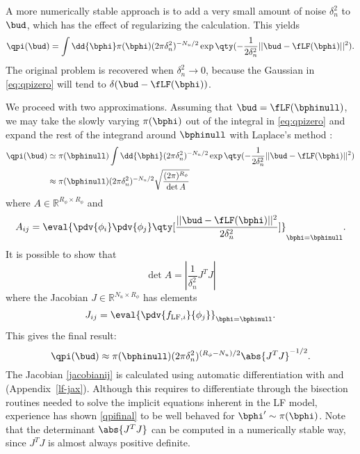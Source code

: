 \begin{chapterappendices}{4}
A more numerically stable approach is to add a very small amount of noise $\delta_n^2$ to $\bud$, which has the effect of regularizing the calculation.
This yields
\begin{equation}
\qpi(\bud) = \int \dd{\bphi} \pi(\bphi) (2 \pi \delta_n^2)^{-N_u/2} \exp\qty(-\frac{1}{2\delta_n^2} ||\bud - \fLF(\bphi)||^2). \label{eq:qpizero}
\end{equation}
The original problem is recovered when $\delta_n^2 \rightarrow 0$, because the Gaussian in \eqref{eq:qpizero} will tend to $\delta(\bud - \fLF(\bphi))$.

We proceed with two approximations.
Assuming that $\bud = \fLF(\bphinull)$, we may take the slowly varying $\pi(\bphi)$ out of the integral in \eqref{eq:qpizero} and expand the rest of the integrand around $\bphinull$ with Laplace's method \citep[Ch.~27]{MacKay2005}:
\begin{align}
    \qpi(\bud) &\simeq \pi(\bphinull) \int \dd{\bphi} (2 \pi \delta_n^2)^{-N_u/2} \exp\qty(-\frac{1}{2\delta_n^2} ||\bud - \fLF(\bphi)||^2) \notag \\
           &\approx \pi(\bphinull) (2 \pi \delta_n^2)^{-N_u/2} \sqrt{\frac{(2\pi)^{R_\phi}}{\det A}}
\end{align}
where $A \in \mathbb{R}^{R_{\phi}\times R_{\phi}}$ and
\begin{equation}
A_{ij} = \eval{\pdv{\phi_i}\pdv{\phi_j}\qty[\frac{||\bud - \fLF(\bphi)||^2}{2\delta_n^2}]}_{\bphi = \bphinull}.
\end{equation}
It is possible to show that
\begin{equation}
\det A = \left| \frac{1}{\delta_n^2} J^T J \right|
\end{equation}
where the Jacobian $J \in \mathbb{R}^{N_u\times R_\phi}$ has elements
\begin{equation}
J_{ij} = \eval{\pdv{f_{\text{LF},i}}{\phi_j}}_{\bphi = \bphinull}. \label{jacobianij}
\end{equation}
This gives the final result:
\begin{equation}
    \qpi(\bud) \approx \pi(\bphinull) (2 \pi \delta_n^2)^{(R_\phi-N_u)/2} \abs{J^T J}^{-1/2}. \label{qpifinal}
\end{equation}
The Jacobian \eqref{jacobianij} is calculated using automatic differentiation with \JAX and \JAXopt (Appendix~\ref{lf-jax}).
Although this requires \JAXopt to differentiate through the bisection routines needed to solve the implicit equations inherent in the LF model, experience has shown \eqref{qpifinal} to be well behaved for $\bphi' \sim \pi(\bphi)$.
Note that the determinant $\abs{J^T J}$ can be computed in a numerically stable way, since $J^T J$ is almost always positive definite.

\end{chapterappendices}
